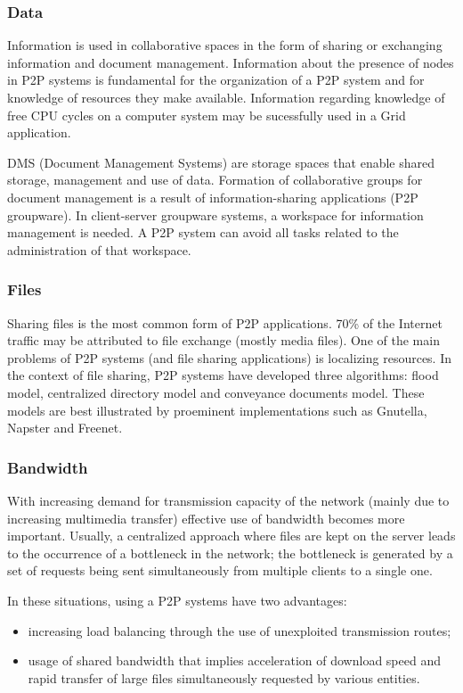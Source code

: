 \subsubsection{Data}

Information is used in collaborative spaces in the form of sharing or
exchanging information and document management. Information about the presence
of nodes in P2P systems is fundamental for the organization of a P2P system
and for knowledge of resources they make available. Information regarding
knowledge of free CPU cycles on a computer system may be sucessfully used in a
Grid application.

DMS (Document Management Systems) are storage spaces that enable shared
storage, management and use of data. Formation of collaborative groups for
document management is a result of information-sharing applications (P2P
groupware). In client-server groupware systems, a workspace for
information management is needed. A P2P system can avoid all tasks related to
the administration of that workspace.

\subsubsection{Files}

Sharing files is the most common form of P2P applications. 70\% of the
Internet traffic may be attributed to file exchange (mostly media files). One
of the main problems of P2P systems (and file sharing applications) is
localizing resources. In the context of file sharing, P2P systems have
developed three algorithms: flood model, centralized directory model and
conveyance documents model. These models are best illustrated by proeminent
implementations such as Gnutella, Napster and Freenet.

\subsubsection{Bandwidth}

With increasing demand for transmission capacity of the network (mainly due to
increasing multimedia transfer) effective use of bandwidth becomes more
important. Usually, a centralized approach where files are kept on the
server leads to the occurrence of a bottleneck in the network; the
bottleneck is generated by a set of requests being sent simultaneously from
multiple clients to a single one.

In these situations, using a P2P systems have two advantages:
\begin{itemize}
  \item increasing load balancing through the use of unexploited transmission
  routes;
  \item usage of shared bandwidth that implies acceleration of download speed
  and rapid transfer of large files simultaneously requested by various
  entities.
\end{itemize}


